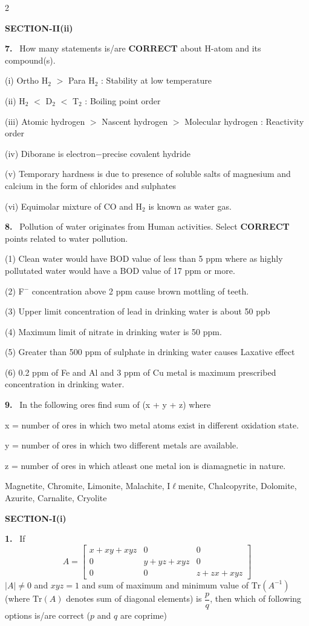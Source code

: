 \documentclass[10pt]{extarticle}
\newcommand{\partsec}[2]{\par\medskip\noindent{\large\bfseries PART-#1: #2}\par\smallskip}
\newcommand{\sect}[1]{\par\smallskip\noindent\textbf{#1}\par}
\newcommand{\qn}[1]{\par\smallskip\noindent\textbf{#1.}~}
\begin{document}
\begin{multicols}{2}
\sect{SECTION-II(ii)}
\qn{7} How many statements is/are \textbf{CORRECT} about H-atom and its compound(s).\par
(i) Ortho H$_2$ $>$ Para H$_2$ : Stability at low temperature\par
(ii) H$_2$ $<$ D$_2$ $<$ T$_2$ : Boiling point order\par
(iii) Atomic hydrogen $>$ Nascent hydrogen $>$ Molecular hydrogen : Reactivity order\par
(iv) Diborane is electron$-$precise covalent hydride\par
(v) Temporary hardness is due to presence of soluble salts of magnesium and calcium in the form of chlorides and sulphates\par
(vi) Equimolar mixture of CO and H$_2$ is known as water gas.
\qn{8} Pollution of water originates from Human activities. Select \textbf{CORRECT} points related to water pollution.\par
(1) Clean water would have BOD value of less than 5 ppm where as highly pollutated water would have a BOD value of 17 ppm or more.\par
(2) F$^-$ concentration above 2 ppm cause brown mottling of teeth.\par
(3) Upper limit concentration of lead in drinking water is about 50 ppb\par
(4) Maximum limit of nitrate in drinking water is 50 ppm.\par
(5) Greater than 500 ppm of sulphate in drinking water causes Laxative effect\par
(6) 0.2 ppm of Fe and Al and 3 ppm of Cu metal is maximum prescribed concentration in drinking water.
\qn{9} In the following ores find sum of (x + y + z) where\par
x = number of ores in which two metal atoms exist in different oxidation state.\par
y = number of ores in which two different metals are available.\par
z = number of ores in which atleast one metal ion is diamagnetic in nature.\par
Magnetite, Chromite, Limonite, Malachite, I$\ell$menite, Chalcopyrite, Dolomite, Azurite, Carnalite, Cryolite
\partsec{3}{MATHEMATICS}
\sect{SECTION-I(i)}
\qn{1} If \[A=\begin{bmatrix}\scriptstyle x+xy+xyz&0&0\\0&\scriptstyle y+yz+xyz&0\\0&0&\scriptstyle z+zx+xyz\end{bmatrix}\] $|A|\neq0$ and $xyz=1$ and sum of maximum and minimum value of $\text{Tr}(A^{-1})$ (where $\text{Tr}(A)$ denotes sum of diagonal elements) is $\dfrac pq$, then which of following options is/are correct ($p$ and $q$ are coprime)

\end{multicols}
\end{document}
